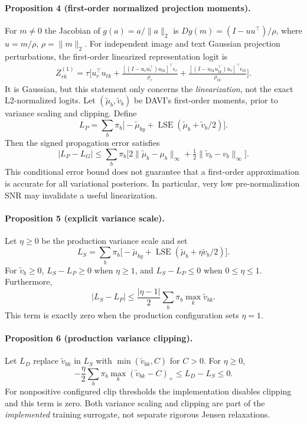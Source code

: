 \paragraph{Proposition 4 (first-order normalized projection moments).}
For $m\ne0$ the Jacobian of $g(a)=a/\|a\|_2$ is
$Dg(m)=(I-uu^\top)/\rho$, where $u=m/\rho$, $\rho=\|m\|_2$.
For independent image and text Gaussian projection perturbations,
the first-order linearized representation logit is
\begin{align}
Z^{(1)}_{rk}=\tau\bigg[u_r^\top u_{tk}
+\frac{[(I-u_ru_r^\top)u_{tk}]^\top\epsilon_r}{\rho_r}
+\frac{[(I-u_{tk}u_{tk}^\top)u_r]^\top\epsilon_{tk}}{\rho_{tk}}\bigg].
\end{align}
It is Gaussian, but this statement only concerns the \emph{linearization},
not the exact L2-normalized logits. Let $(\widetilde\mu_b,
\widetilde v_b)$ be DAVI's first-order moments, prior to
variance scaling and clipping. Define
\begin{equation}
L_P=\sum_b\pi_b\big[-\widetilde\mu_{by}
+\operatorname{LSE}(\widetilde\mu_b+\widetilde v_b/2)\big].
\end{equation}
Then the signed propagation error satisfies
\begin{equation}
|L_P-L_G|\le\sum_b\pi_b\Big[
2\|\widetilde\mu_b-\mu_b\|_\infty+
\tfrac12\|\widetilde v_b-v_b\|_\infty\Big].
\end{equation}
This conditional error bound does not guarantee that a first-order
approximation is accurate for all variational posteriors. In particular,
very low pre-normalization SNR may invalidate a useful linearization.

\paragraph{Proposition 5 (explicit variance scale).}
Let $\eta\ge0$ be the production variance scale and set
\begin{equation}
L_S=\sum_b\pi_b\big[-\widetilde\mu_{by}
+\operatorname{LSE}(\widetilde\mu_b+\eta\widetilde v_b/2)\big].
\end{equation}
For $\widetilde v_b\ge0$,
$L_S-L_P\ge0$ when $\eta\ge1$, and $L_S-L_P\le0$
when $0\le\eta\le1$. Furthermore,
\begin{equation}
|L_S-L_P|\le\frac{|\eta-1|}{2}
\sum_b\pi_b\max_k\widetilde v_{bk}.
\end{equation}
This term is exactly zero when the production configuration sets $\eta=1$.

\paragraph{Proposition 6 (production variance clipping).}
Let $L_D$ replace $\widetilde v_{bk}$ in $L_S$ with
$\min(\widetilde v_{bk},C)$ for $C>0$. For $\eta\ge0$,
\begin{equation}
-\frac\eta2\sum_b\pi_b\max_k(\widetilde v_{bk}-C)_+
\le L_D-L_S\le0.
\end{equation}
For nonpositive configured clip thresholds the implementation disables
clipping and this term is zero. Both variance scaling and clipping
are part of the \emph{implemented} training surrogate, not separate
rigorous Jensen relaxations.

